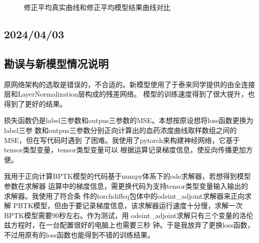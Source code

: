 \documentclass{article}
\begin{document}
\begin{figure}
  \centering
  \caption{修正平均真实曲线和修正平均模型结果曲线对比}
  \label{fig:main8}
\end{figure}

\subsection*{2024/04/03}
\subsection*{勘误与新模型情况说明}

原网络架构的选取是错误的，不合适的。新模型使用了于泰来同学提供的由全连接层和LayerNormalization层构成的残差网络。
模型的训练速度得到了很大提升，也得到了更好的结果。

损失函数仍是label三参数和outpus三参数的MSE。本想按原设想将loss函数更换为label三参
数和outpus三参数分别正向计算出的血药浓度曲线取样数组之间的MSE，但在写代码时遇到
了困难。我使用了pytorch来构建神经网络，它基于tensor类型变量，tensor类型变量可以
根据运算记录梯度信息，使反向传播更加方便。

我用于正向计算BPTK模型的代码基于numpy体系下的ode求解器，若想得到模型参数在求解器
运算中的梯度信息，需更换代码为支持tensor类型变量输入输出的求解器。我使用了符合条
件的torchdiffeq包体中的odeint\_adjoint求解器来正向求解
PBTK模型，但由于要记录梯度信息，该求解器运行速度十分慢，求解一次BPTK模型需要90秒左右。作为测试，用
odeint\_adjoint求解只有三个变量的洛伦兹方程时，在一台配置很好的电脑上也需要三秒
钟。于是我放弃了更换loss函数，不过用原有的loss函数也能得到不错的训练结果。
\end{document}
